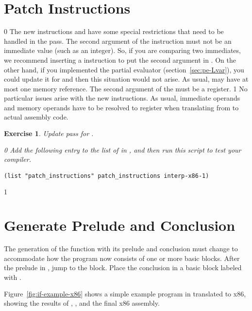 \documentclass[7x10]{TimesAPriori_MIT}%
\def\racketEd{0}
\def\pythonEd{1}
\def\edition{1}
\def\xeightysixEd{0}
\def\riscvEd{1}
\def\architecture{1}
\newcommand{\pythonColor}[0]{}
\newtheorem{exercise}[theorem]{Exercise}
\numberwithin{theorem}{chapter}
\numberwithin{definition}{chapter}
\numberwithin{equation}{chapter}
\begin{document}
\section{Patch Instructions}

\if\architecture\xeightysixEd
The new instructions  and  have some special
restrictions that need to be handled in the 
pass.
%
The second argument of the  instruction must not be an
immediate value (such as an integer). So, if you are comparing two
immediates, we recommend inserting a  instruction to put the
second argument in . On the other hand, if you implemented
the partial evaluator (section~\ref{sec:pe-Lvar}), you could
update it for \LangIf{} and then this situation would not arise.
%
As usual,  may have at most one memory reference.
%
The second argument of the  must be a register.
\fi
\if\architecture\riscvEd
No particular issues arise with the new instructions. As usual,
immediate operands and memory operands have to be resolved to register
when translating from  \LangXIf{} to actual assembly code.

\begin{exercise}\normalfont\normalsize
%
Update  pass for \LangXIfVar{}.
%  
{\if\edition\racketEd
Add the following entry to the list of  in
, and then run this script to test your compiler.
\begin{lstlisting}
(list "patch_instructions" patch_instructions interp-x86-1)
\end{lstlisting}
\fi}
\end{exercise}


{\if\edition\pythonEd\pythonColor
  
\section{Generate Prelude and Conclusion}
\label{sec:prelude-conclusion-cond}

The generation of the  function with its prelude and
conclusion must change to accommodate how the program now consists of
one or more basic blocks. After the prelude in , jump to
the  block. Place the conclusion in a basic block labeled
with .

\fi}


Figure~\ref{fig:if-example-x86} shows a simple example program in
\LangIf{} translated to x86, showing the results of
, , and the final
x86 assembly.
\end{document}
